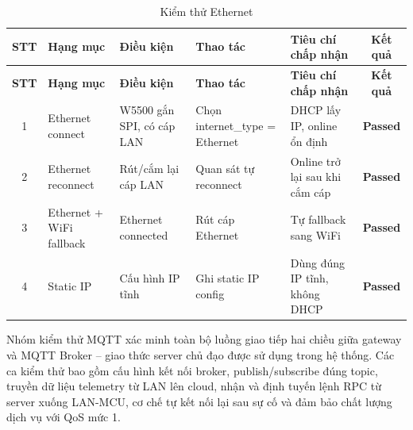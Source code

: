         \begin{longtable}{|c|p{2cm}|p{3.5cm}|p{2.5cm}|p{4cm}|c|}
            \caption{Kiểm thử Ethernet}
            \label{tab:test_ethernet} \\
            \hline
            \textbf{STT} & \textbf{Hạng mục} & \textbf{Điều kiện} & \textbf{Thao tác} & \textbf{Tiêu chí chấp nhận} & \textbf{Kết quả} \\ \hline
            \endfirsthead

            \hline
            \textbf{STT} & \textbf{Hạng mục} & \textbf{Điều kiện} & \textbf{Thao tác} & \textbf{Tiêu chí chấp nhận} & \textbf{Kết quả} \\ \hline
            \endhead

            \hline
            \endfoot
            \endlastfoot

            1 & Ethernet connect & W5500 gắn SPI, có cáp LAN & Chọn internet\_type = Ethernet & DHCP lấy IP, online ổn định & \textcolor{modern_blue}{\textbf{Passed}} \\ \hline
            2 & Ethernet reconnect & Rút/cắm lại cáp LAN & Quan sát tự reconnect & Online trở lại sau khi cắm cáp & \textcolor{modern_blue}{\textbf{Passed}} \\ \hline
            3 & Ethernet + WiFi fallback & Ethernet connected & Rút cáp Ethernet & Tự fallback sang WiFi & \textcolor{modern_blue}{\textbf{Passed}} \\ \hline
            4 & Static IP & Cấu hình IP tĩnh & Ghi static IP config & Dùng đúng IP tĩnh, không DHCP & \textcolor{modern_blue}{\textbf{Passed}} \\ \hline
        \end{longtable}

        Nhóm kiểm thử MQTT xác minh toàn bộ luồng giao tiếp hai chiều giữa gateway và MQTT Broker -- giao thức server chủ đạo được sử dụng trong hệ thống. Các ca kiểm thử bao gồm cấu hình kết nối broker, publish/subscribe đúng topic, truyền dữ liệu telemetry từ LAN lên cloud, nhận và định tuyến lệnh RPC từ server xuống LAN-MCU, cơ chế tự kết nối lại sau sự cố và đảm bảo chất lượng dịch vụ với QoS mức 1.

